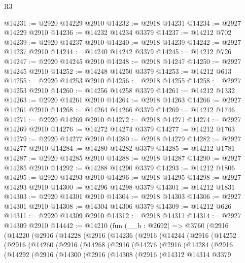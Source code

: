 \begin{lexlean}{R3}
\begin{coremodule}
@14231 := @2920 @14229 @2910
@14232 := @2918 @14231
@14234 := @2927 @14229 @2910
@14236 := @14232 @14234 @3379
@14237 := @14212 @702
@14239 := @2920 @14237 @2910
@14240 := @2918 @14239
@14242 := @2927 @14237 @2910
@14244 := @14240 @14242 @3379
@14245 := @14212 @726
@14247 := @2920 @14245 @2910
@14248 := @2918 @14247
@14250 := @2927 @14245 @2910
@14252 := @14248 @14250 @3379
@14253 := @14212 @613
@14255 := @2920 @14253 @2910
@14256 := @2918 @14255
@14258 := @2927 @14253 @2910
@14260 := @14256 @14258 @3379
@14261 := @14212 @1332
@14263 := @2920 @14261 @2910
@14264 := @2918 @14263
@14266 := @2927 @14261 @2910
@14268 := @14264 @14266 @3379
@14269 := @14212 @1746
@14271 := @2920 @14269 @2910
@14272 := @2918 @14271
@14274 := @2927 @14269 @2910
@14276 := @14272 @14274 @3379
@14277 := @14212 @1763
@14279 := @2920 @14277 @2910
@14280 := @2918 @14279
@14282 := @2927 @14277 @2910
@14284 := @14280 @14282 @3379
@14285 := @14212 @1781
@14287 := @2920 @14285 @2910
@14288 := @2918 @14287
@14290 := @2927 @14285 @2910
@14292 := @14288 @14290 @3379
@14293 := @14212 @1806
@14295 := @2920 @14293 @2910
@14296 := @2918 @14295
@14298 := @2927 @14293 @2910
@14300 := @14296 @14298 @3379
@14301 := @14212 @1831
@14303 := @2920 @14301 @2910
@14304 := @2918 @14303
@14306 := @2927 @14301 @2910
@14308 := @14304 @14306 @3379
@14309 := @14212 @626
@14311 := @2920 @14309 @2910
@14312 := @2918 @14311
@14314 := @2927 @14309 @2910
@14442 := @14210
    (fun (__b : @2692) =>
    @3760
      (@2916
        (@14220
          (@2916
            (@14228
              (@2916
                (@14236
                  (@2916
                    (@14244
                      (@2916
                        (@14252
                          (@2916
                            (@14260
                              (@2916
                                (@14268
                                  (@2916
                                    (@14276
                                      (@2916
                                        (@14284
                                          (@2916
                                            (@14292
                                              (@2916
                                                (@14300
                                                  (@2916
                                                    (@14308
                                                      (@2916
                                                        (@14312
                                                          @14314
                                                          @3379

\end{coremodule}
\end{lexlean}
